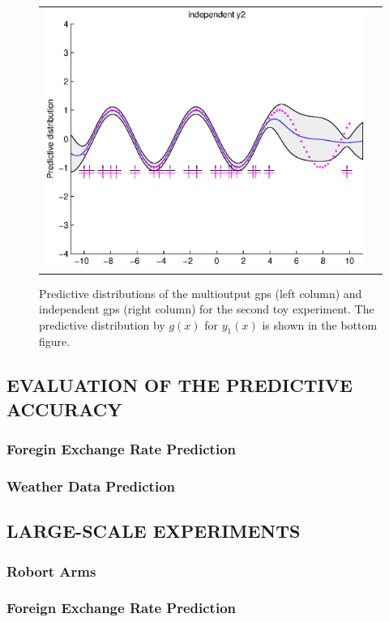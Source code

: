 \begin{figure}
\begin{tabular}{cc}
\includegraphics[scale=0.5]{figures/ssvi2-svi2.eps} \\
\end{tabular}
\label{fig5}
\caption{Predictive distributions of the multioutput gps (left column) and independent gps (right column) for the second toy experiment. The predictive distribution by $g(x)$ for $y_1(x)$ is shown in the bottom figure.}
\end{figure}

\subsection{EVALUATION OF THE PREDICTIVE ACCURACY}
\subsubsection{Foregin Exchange Rate Prediction}
\subsubsection{Weather Data Prediction}

\subsection{LARGE-SCALE EXPERIMENTS}
\subsubsection{Robort Arms}
\subsubsection{Foreign Exchange Rate Prediction}
